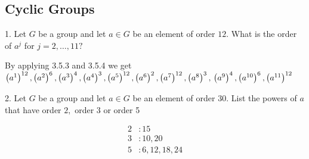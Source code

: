 \subsection{Cyclic Groups}
\begin{mdframed}[style=darkQuesion]
  1. Let $G$ be a group and let $a \in G$ be an element of order $12 .$ 
  What is the order of $a^{j}$ for $j=2, \ldots, 11 ?$
\end{mdframed}
\begin{mdframed}[style=darkAnswer,frametitle={Joe Starr}]
  By applying 3.5.3 and 3.5.4 we get
$\left(a^{1}\right)^{12},\left(a^{2}\right)^{6},\left(a^{3}\right)^{4},\left(a^{4}\right)^{3},\left(a^{5}\right)^{12},
\left(a^{6}\right)^{2},\left(a^{7}\right)^{12},\left(a^{8}\right)^{3},\\\left(a^{9}\right)^{4},\left(a^{10}\right)^{6},
\left(a^{11}\right)^{12}$ 
\end{mdframed}
\newpage
\begin{mdframed}[style=darkQuesion]
2. Let $G$ be a group and let $a \in G$ be an element of order $30 .$ 
List the powers of $a$ that have order $2,$ order 3 or order 5
\end{mdframed}
\begin{mdframed}[style=darkAnswer,frametitle={Joe Starr}]
\begin{align*}
  2&: 15\\
  3&: 10, 20\\
  5&: 6,12,18,24\\
\end{align*}
\end{mdframed}
\newpage
